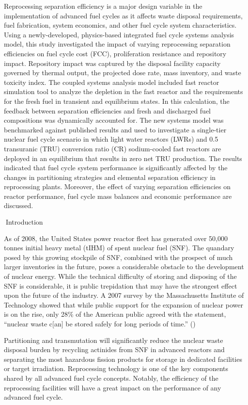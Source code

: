 	Reprocessing separation efficiency is a major design variable in the
implementation of advanced fuel cycles as it affects waste disposal
requirements, fuel fabrication, system economics, and other fuel cycle
system characteristics.  Using a newly-developed, physics-based
integrated fuel cycle systems analysis model, this study investigated
the impact of varying reprocessing separation efficiencies on fuel cycle
cost (FCC), proliferation resistance and repository impact. Repository
impact was captured by the disposal facility capacity governed by
thermal output, the projected dose rate, mass inventory, and waste
toxicity index.  The coupled systems analysis model included fast
reactor simulation tool to analyze the depletion in the fast reactor and
the requirements for the fresh fuel in transient and equilibrium states.
In this calculation, the feedback between separation efficiencies and
fresh and discharged fuel compositions was dynamically accounted for.
The new systems model was benchmarked against published results and used
to investigate a single-tier nuclear fuel cycle scenario in which light
water reactors (LWRs) and 0.5 transuranic (TRU) conversion ratio (CR)
sodium-cooled fast reactors are deployed in an equilibrium that results
in zero net TRU production.  The results indicated that fuel cycle
system performance is significantly affected by the changes in
partitioning strategies and elemental separation efficiency in
reprocessing plants.  Moreover, the effect of varying separation
efficiencies on reactor performance, fuel cycle mass balances and
economic performance are discussed. 

Introduction

As of 2008, the United States power reactor fleet has generated over
50,000 tonnes initial heavy metal (tIHM) of spent nuclear fuel (SNF). 
The quandary posed by this growing stockpile of SNF, combined with the
prospect of much larger inventories in the future, poses a considerable
obstacle to the development of nuclear energy.  While the technical
difficulty of storing and disposing of the SNF is considerable, it is
public trepidation that may have the strongest effect upon the future of
the industry.  A 2007 survey by the Massachusetts Institute of
Technology showed that while public support for the expansion of nuclear
power is on the rise, only 28\% of the American public agreed with the
statement, ``nuclear waste c$[$an$]$ be stored safely for long periods
of time.'' ()

 Partitioning and transmutation will significantly reduce the nuclear
waste disposal burden by recycling actinides from SNF in advanced
reactors and separating the most hazardous fission products for storage
in dedicated facilities or target irradiation.  Reprocessing technology
is one of the key components shared by all advanced fuel cycle concepts.
 Notably, the efficiency of the reprocessing facilities will have a
great impact on the performance of any advanced fuel cycle. 

